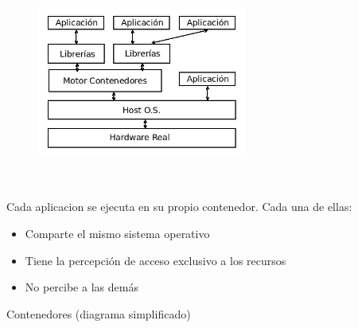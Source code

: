 \documentclass[ucs]{beamer}
\begin{document}
\begin{frame}[fragile]

\begin{minipage}{5cm}
\begin{figure}
\centerline{\includegraphics[width=6.9cm]{figs/cajas_cont}}
\end{figure}
\end{minipage} \hfill
\
\begin{minipage}{4cm}
Cada aplicacion se ejecuta en su propio contenedor. 
Cada una de ellas:
\begin{itemize}
\item
Comparte el mismo sistema operativo
\item
Tiene la percepción de acceso exclusivo a los recursos
\item
No percibe a las demás
\end{itemize}
\end{minipage}\hfill

\begin{footnotesize}
Contenedores (diagrama simplificado)
\end{footnotesize}
\end{frame}
\end{document}
